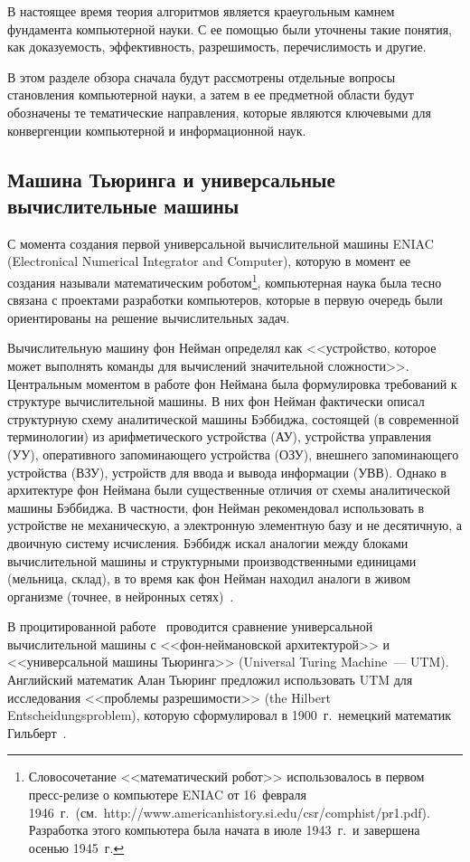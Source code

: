 \begin{multicols}{2}
      В настоящее время теория алгоритмов является краеугольным камнем фундамента
компьютерной науки. С ее помощью были уточнены такие понятия, как доказуемость,
эффективность, разрешимость, перечислимость и другие.

      В этом разделе обзора сначала будут рассмотрены отдельные вопросы становления
компьютерной науки, а затем в ее предметной области будут обозначены те тематические
направления, которые являются ключевыми для конвергенции компьютерной и
информационной наук.

\subsection{Машина Тьюринга и универсальные вычислительные машины} %

      С момента создания первой универсальной вычислительной машины ENIAC (Electronical
Numerical Integrator and Computer), которую в момент ее создания называли математическим
роботом\footnote{Словосочетание <<математический робот>> использовалось в первом пресс-релизе о
компьютере ENIAC от 16~февраля 1946~г.\ (см.\ 
{\sf http://www.americanhistory.si.edu/csr/comphist/pr1.pdf}). Разработка этого компьютера была начата 
в июле 1943~г.\ и завершена осенью
1945~г.}, компьютерная наука была тесно связана с проектами разработки компьютеров,
которые в первую очередь были ориентированы на решение вычислительных задач.

      Вычислительную машину фон Нейман определял как <<устройство, которое может
выполнять команды для вычислений значительной слож\-ности>>. Центральным моментом в
работе фон Неймана была формулировка требований к структуре вычислительной машины. В
них фон Нейман фактически описал структурную схему аналитической машины Бэббиджа,
состоящей (в современной терминологии) из арифметического устройства (АУ), устройства
управления (УУ), оперативного запоминающего устройства (ОЗУ), внешнего запоминающего
устройства (ВЗУ), устройств для ввода и вывода информации (УВВ). Однако в архитектуре фон
Неймана были существенные отличия от схемы аналитической машины Бэббиджа. В частности,
фон Нейман рекомендовал использовать в устройстве не механическую, а электронную
элементную базу и не десятичную, а двоичную систему ис\-чис\-ле\-ния. Бэббидж искал аналогии
между блоками вычислительной машины и структурными производственными единицами
(мельница, склад), в то время как фон Нейман находил аналоги в живом организме (точнее, в
нейронных сетях)~\cite{26za}.

      В процитированной работе~\cite{26za} проводится сравнение универсальной
вычислительной машины с <<фон-неймановской архитектурой>> и <<универсальной машины
Тьюринга>> (Universal Turing Machine~--- UTM). Английский математик Алан Тьюринг
предложил использовать UTM для исследования <<проблемы разрешимости>> (the Hilbert
Entscheidungsproblem), которую сформулировал в 1900~г.\ немецкий математик
Гильберт~\cite{27za}.


\end{multicols}
